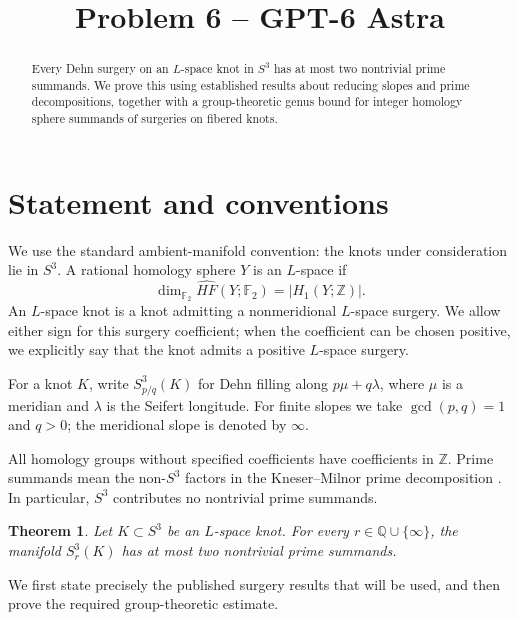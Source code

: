 \documentclass[11pt]{article}
\title{Problem 6 -- GPT-6 Astra}
\author{}
\date{}
\newcommand{\Z}{\mathbb{Z}}
\newcommand{\F}{\mathbb{F}_2}
\newcommand{\surg}[2]{S^3_{#1}(#2)}
\newtheorem{theorem}{Theorem}
\begin{document}
\maketitle

\begin{abstract}
Every Dehn surgery on an \(L\)-space knot in \(S^3\) has at most two
nontrivial prime summands. We prove this using established results about
reducing slopes and prime decompositions, together with a
group-theoretic genus bound for integer homology sphere summands of
surgeries on fibered knots.
\end{abstract}

\section{Statement and conventions}

We use the standard ambient-manifold convention: the knots under
consideration lie in \(S^3\). A rational homology sphere \(Y\) is an
\(L\)-space if
\[
    \dim_{\F}\widehat{HF}(Y;\F)=|H_1(Y;\Z)|.
\]
An \(L\)-space knot is a knot admitting a nonmeridional \(L\)-space
surgery. We allow either sign for this surgery coefficient; when the
coefficient can be chosen positive, we explicitly say that the knot
admits a positive \(L\)-space surgery.

For a knot \(K\), write \(\surg{p/q}{K}\) for Dehn filling along
\(p\mu+q\lambda\), where \(\mu\) is a meridian and \(\lambda\) is the
Seifert longitude. For finite slopes we take \(\gcd(p,q)=1\) and \(q>0\);
the meridional slope is denoted by \(\infty\).

All homology groups without specified coefficients have coefficients
in \(\Z\). Prime summands mean the non-\(S^3\) factors in the
Kneser--Milnor prime decomposition
\cite[Theorem~1]{Milnor}. In particular, \(S^3\) contributes no
nontrivial prime summands.

\begin{theorem}\label{thm:main}
Let \(K\subset S^3\) be an \(L\)-space knot. For every
\(r\in\mathbb{Q}\cup\{\infty\}\), the manifold \(\surg{r}{K}\) has at most
two nontrivial prime summands.
\end{theorem}

We first state precisely the published surgery results that will be
used, and then prove the required group-theoretic estimate.
\end{document}
